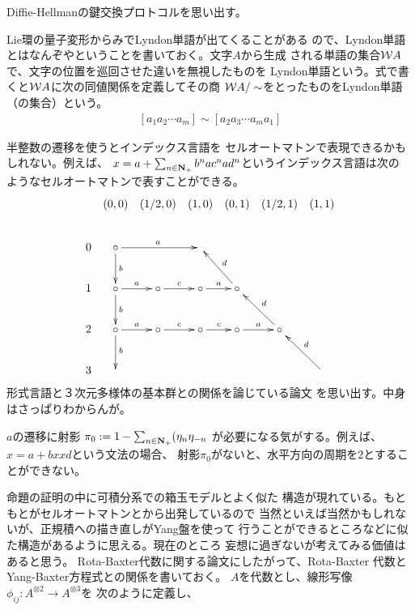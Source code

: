 {\begin{description}
		Diffie-Hellmanの鍵交換プロトコルを思い出す。
		\item[Lyndon単語] Lie環の量子変形からみでLyndon単語が出てくることがある
		ので、Lyndon単語とはなんぞやということを書いておく。文字$A$から生成
		される単語の集合${{\mathcal{W}}} A$で、文字の位置を巡回させた違いを無視したものを
		Lyndon単語という。式で書くと${{\mathcal{W}}} A$に次の同値関係を定義してその商
		${{\mathcal{W}}} A/\sim$をとったものをLyndon単語（の集合）という。
		\begin{equation*}\begin{split}
			[a_1a_2\cdots a_m] \sim [a_2a_3\cdots a_ma_1]
		\end{split}\end{equation*}
		\item[インデックス言語] 半整数の遷移を使うとインデックス言語を
		セルオートマトンで表現できるかもしれない。例えば、
		$x=a+\sum_{n\in\mathbf{N}_+}b^nac^nad^n$というインデックス言語は次の
		ようなセルオートマトンで表すことができる。
		\begin{equation*}\xymatrix@C=1ex{
			& (0,0) & (1/2,0) & (1,0) & (0,1) & (1/2,1) & (1,1) \\
			0 & \circ \ar[rr]^a \ar[d]^b & & \\
			1 & \circ \ar[r]^a \ar[d]^b & \circ \ar[r]^c & \circ \ar[r]^a 
			& \circ \ar[ul]_d \\
			2 & \circ \ar[r]^a \ar[d]^b & \circ \ar[r]^c & \circ \ar[r]^c 
			& \circ \ar[r]^a & \circ \ar[ul]_d \\
			3 & & & & & & \ar[ul]_d \\
		}\end{equation*}
		形式言語と３次元多様体の基本群との関係を論じている論文
		\cite{gilman1996}を思い出す。中身はさっぱりわからんが。
		\item[セルオートマトン] $a$の遷移に射影
		$\pi_0:=1-\sum_{n\in\mathbf{N}_+}(\eta_n\eta_{-n}$
		が必要になる気がする。例えば、$x=a+bxxd$という文法の場合、
		射影$\pi_0$がないと、水平方向の周期を$2$とすることができない。
		\item[Yang-Baxter] 命題の証明の中に可積分系での箱玉モデルとよく似た
		構造が現れている。もともとがセルオートマトンとから出発しているので
		当然といえば当然かもしれないが、正規積への描き直しがYang盤を使って
		行うことができるところなどに似た構造があるように思える。現在のところ
		妄想に過ぎないが考えてみる価値はあると思う。
		Rota-Baxter代数に関する論文\cite{aguiar2000}にしたがって、Rota-Baxter
		代数とYang-Baxter方程式との関係を書いておく。
		$A$を代数とし、線形写像$\phi_{ij}:A^{\otimes2}\to A^{\otimes3}$を
		次のように定義し、
		\begin{equation*}\begin{split}

\end{split}
\end{equation*}
\end{description}}
